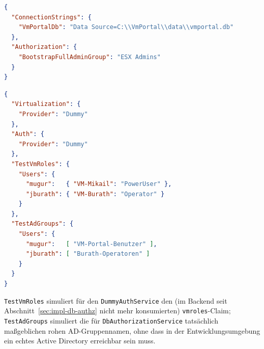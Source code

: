 \documentclass[12pt,a4paper]{article}
\begin{document}
\begin{lstlisting}[language=json, caption={appsettings.Production.json — Zielumgebungs-Überschreibungen}, label={lst:appsettingsprod}]
{
  "ConnectionStrings": {
    "VmPortalDb": "Data Source=C:\\VmPortal\\data\\vmportal.db"
  },
  "Authorization": {
    "BootstrapFullAdminGroup": "ESX Admins"
  }
}
\end{lstlisting}

\begin{lstlisting}[language=json, caption={appsettings.Development.json — Umschaltung auf Dummy-Provider und -Auth}, label={lst:appsettingsdev}]
{
  "Virtualization": {
    "Provider": "Dummy"
  },
  "Auth": {
    "Provider": "Dummy"
  },
  "TestVmRoles": {
    "Users": {
      "mugur":   { "VM-Mikail": "PowerUser" },
      "jburath": { "VM-Burath": "Operator" }
    }
  },
  "TestAdGroups": {
    "Users": {
      "mugur":   [ "VM-Portal-Benutzer" ],
      "jburath": [ "Burath-Operatoren" ]
    }
  }
}
\end{lstlisting}

\texttt{TestVmRoles} simuliert für den \texttt{DummyAuthService} den (im Backend seit Abschnitt~\ref{sec:impl-db-authz} nicht mehr konsumierten) \texttt{vmroles}-Claim; \texttt{TestAdGroups} simuliert die für \texttt{DbAuthorizationService} tatsächlich maßgeblichen rohen AD-Gruppennamen, ohne dass in der Entwicklungsumgebung ein echtes Active Directory erreichbar sein muss.

\clearpage
\printbibliography[heading=bibintoc]
\clearpage
\end{document}
